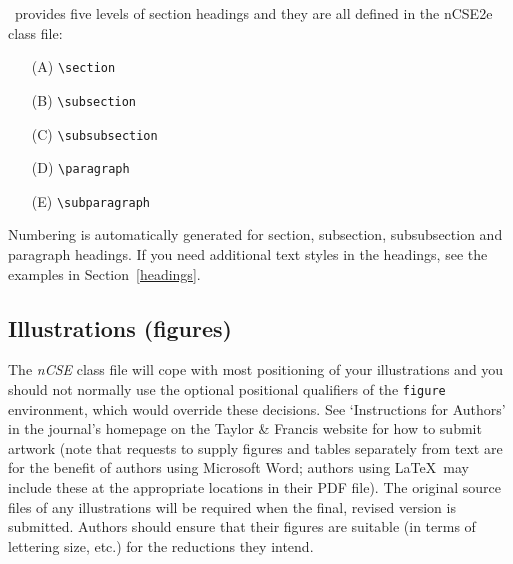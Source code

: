 \documentclass{nCSE2e}
\begin{document}
\LaTeXe\ provides five levels of section headings and they are all defined in the nCSE2e class file:
\begin{enumerate}
   \item[(A)] \verb"\section"
   \item[(B)] \verb"\subsection"
   \item[(C)] \verb"\subsubsection"
   \item[(D)] \verb"\paragraph"
   \item[(E)] \verb"\subparagraph"
\end{enumerate}
Numbering is automatically generated for section, subsection, subsubsection and paragraph headings.  If you need
additional text styles in the headings, see the examples in Section~\ref{headings}.


\subsection{Illustrations (figures)}

The {\it nCSE} class file will cope with most positioning of your illustrations and you should not normally use the
optional positional qualifiers of the {\tt figure} environment, which would override these decisions. See
`Instructions for Authors' in the journal's homepage on the Taylor \& Francis website for how to submit artwork (note that requests to supply figures and tables separately from text are for the benefit of authors using Microsoft Word; authors using \LaTeX\ may include these at the appropriate locations in their PDF file). The original source files of any illustrations will be required when the final, revised version is submitted. Authors should ensure that their figures are suitable (in terms of lettering size, etc.) for the reductions they intend.
\end{document}
